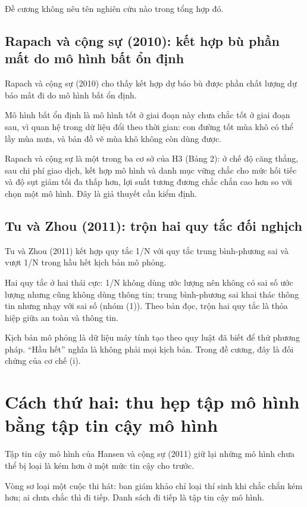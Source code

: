Đề cương không nêu tên nghiên cứu nào trong tổng hợp đó.

\subsection{Rapach và cộng sự (2010): kết hợp bù phần mất do mô hình bất ổn định}

Rapach và cộng sự (2010) cho thấy kết hợp dự báo bù được phần chất lượng dự báo mất đi do mô hình bất ổn định.

Mô hình bất ổn định là mô hình tốt ở giai đoạn này chưa chắc tốt ở giai đoạn sau, vì quan hệ trong dữ liệu đổi theo thời gian: con đường tốt mùa khô có thể lầy mùa mưa, và bản đồ vẽ mùa khô không còn dùng được.

Rapach và cộng sự là một trong ba cơ sở của H3 (Bảng 2): ở chế độ căng thẳng, sau chi phí giao dịch, kết hợp mô hình và danh mục vững chắc cho mức hối tiếc và độ sụt giảm tối đa thấp hơn, lợi suất tương đương chắc chắn cao hơn so với chọn một mô hình. Đây là giả thuyết cần kiểm định.

\subsection{Tu và Zhou (2011): trộn hai quy tắc đối nghịch}

Tu và Zhou (2011) kết hợp quy tắc 1/N với quy tắc trung bình-phương sai và vượt 1/N trong hầu hết kịch bản mô phỏng.

Hai quy tắc ở hai thái cực: 1/N không dùng ước lượng nên không có sai số ước lượng nhưng cũng không dùng thông tin; trung bình-phương sai khai thác thông tin nhưng nhạy với sai số (nhóm (1)). Theo bản đọc, trộn hai quy tắc là thỏa hiệp giữa an toàn và thông tin.

Kịch bản mô phỏng là dữ liệu máy tính tạo theo quy luật đã biết để thử phương pháp. “Hầu hết” nghĩa là không phải mọi kịch bản. Trong đề cương, đây là đối chứng của cơ chế (i).

\section{Cách thứ hai: thu hẹp tập mô hình bằng tập tin cậy mô hình}

Tập tin cậy mô hình của Hansen và cộng sự (2011) giữ lại những mô hình chưa thể bị loại là kém hơn ở một mức tin cậy cho trước.

Vòng sơ loại một cuộc thi hát: ban giám khảo chỉ loại thí sinh khi chắc chắn kém hơn; ai chưa chắc thì đi tiếp. Danh sách đi tiếp là tập tin cậy mô hình.

